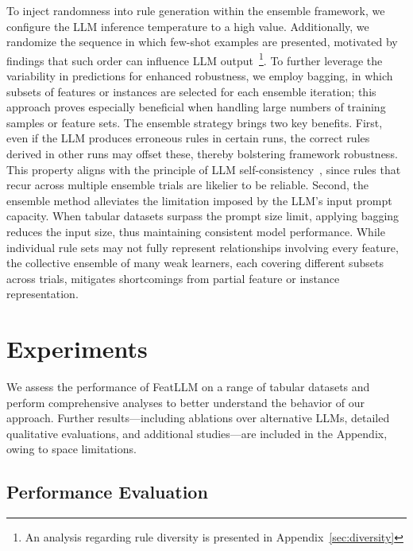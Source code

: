 To inject randomness into rule generation within the ensemble framework, we configure the LLM inference temperature to a high value. Additionally, we randomize the sequence in which few-shot examples are presented, motivated by findings that such order can influence LLM output~\cite{lu2022fantastically}\footnote{An analysis regarding rule diversity is presented in Appendix~\ref{sec:diversity}}. To further leverage the variability in predictions for enhanced robustness, we employ bagging, in which subsets of features or instances are selected for each ensemble iteration; this approach proves especially beneficial when handling large numbers of training samples or feature sets. The ensemble strategy brings two key benefits. First, even if the LLM produces erroneous rules in certain runs, the correct rules derived in other runs may offset these, thereby bolstering framework robustness. This property aligns with the principle of LLM self-consistency~\cite{wang2022self}, since rules that recur across multiple ensemble trials are likelier to be reliable. Second, the ensemble method alleviates the limitation imposed by the LLM’s input prompt capacity. When tabular datasets surpass the prompt size limit, applying bagging reduces the input size, thus maintaining consistent model performance. While individual rule sets may not fully represent relationships involving every feature, the collective ensemble of many weak learners, each covering different subsets across trials, mitigates shortcomings from partial feature or instance representation.

\section{Experiments}
We assess the performance of \textsf{FeatLLM} on a range of tabular datasets and perform comprehensive analyses to better understand the behavior of our approach. Further results—including ablations over alternative LLMs, detailed qualitative evaluations, and additional studies—are included in the Appendix, owing to space limitations.

\subsection{Performance Evaluation}

